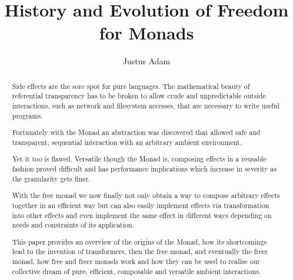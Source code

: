 \documentclass[sigconf]{acmart}
\begin{document}
\title{History and Evolution of Freedom for Monads}

\author{Justus Adam}
\affiliation{}


\begin{abstract}
Side effects are the sore spot for pure languages. The mathematical
beauty of referential transparency has to be broken to allow crude and
unpredictable outside interactions, such as network and filesystem
accesses, that are necessary to write useful programs.

Fortunately with the Monad an abstraction was discovered that allowed
safe and transparent, sequential interaction with an arbitrary ambient
environment.

Yet it too is flawed. Versatile though the Monad is, composing
effects in a reusable fashion proved difficult and has performance
implications which increase in severity as the granularity gets finer.

With the free monad we now finally not only obtain a way to compose
arbitrary effects together in an efficient way but can also easily
implement effects via transformation into other effects and even
implement the same effect in different ways depending on needs and
constraints of its application.

This paper provides an overview of the origins of the Monad, how its
shortcomings lead to the invention of transformers, then the free
monad, and eventually the freer monad, how free and freer monads work
and how they can be used to realise our collective dream of pure,
efficient, composable and versatile ambient interactions.
\end{abstract}

\maketitle








\end{document}
